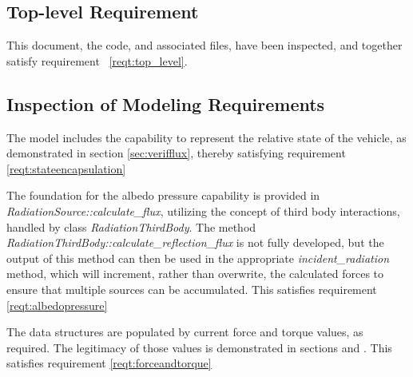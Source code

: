 %
%
%


\subsection{Top-level Requirement}

\label{inspect:top_level}
This document, the code, and associated files, have been inspected, and together
satisfy requirement ~\ref{reqt:top_level}.

\subsection{Inspection of Modeling Requirements}

\label{inspect:stateencapsulation}
The model includes the capability to represent the relative state of the
vehicle, as demonstrated in section \vref{sec:verifflux}, thereby satisfying requirement \ref{reqt:stateencapsulation}

\label{inspect:albedopressure}
The foundation for the albedo pressure capability is provided in
\textit{RadiationSource::calculate\_flux}, utilizing the concept of third body
interactions, handled by class \textit{RadiationThirdBody}.  The method
\textit{RadiationThirdBody::calculate\_reflection\_flux} is not fully developed, but the output of this method can then be used in the appropriate \textit{incident\_radiation} method, which will increment, rather than overwrite, the calculated forces to ensure that multiple sources can be accumulated.  This satisfies requirement \ref{reqt:albedopressure}

\label{inspect:forceandtorque}
The data structures are populated by current force and torque values, as
required.  The legitimacy of those values is demonstrated in sections
 and .  This satisfies requirement \ref{reqt:forceandtorque}

